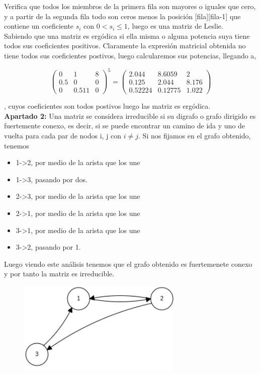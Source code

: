 \documentclass{article}
\begin{document}
Verifica que todos los miembros de la primera fila son mayores o iguales que cero, y a partir de la segunda fila todo son ceros menos la posición [fila][fila-1] que contiene un coeficiente $s_i$ con $0 < s_i \leq 1$, luego es una matriz de Leslie. \\

Sabiendo que una matriz es ergódica si ella misma o alguna potencia suya tiene todos sus coeficientes positivos. Claramente la expresión matricial obtenida no tiene todos sus coeficientes postivos, luego calcularemos sus potencias, llegando a,

\begin{equation*}
\begin{pmatrix}
0 & 1 & 8 \\
0.5 & 0 & 0 \\
0 & 0.511 & 0
\end{pmatrix}
^5 = 
\begin{pmatrix}
2.044 & 8.6059 & 2 \\
0.125 & 2.044 & 8.176 \\
0.52224 & 0.12775 & 1.022
\end{pmatrix}
\end{equation*}

, cuyos coeficientes son todos postivos luego las matriz es ergódica. \\ 

\textbf{Apartado 2:}
Una matriz se considera irreducible si su digrafo o grafo dirigido es fuertemente conexo, es decir, si se puede encontrar un camino de ida y uno de vuelta para cada par de nodos i, j con $i \neq j$. Si nos fijamos en el grafo obtenido, tenemos

\begin{itemize}
\item 1->2, por medio de la arista que los une
\item 1->3, pasando por dos.
\item 2->3, por medio de la arista que los une
\item 2->1, por medio de la arista que los une
\item 3->1, por medio de la arista que los une
\item 3->2, pasando por 1.
\end{itemize}

Luego viendo este análisis tenemos que el grafo obtenido es fuertemenete conexo y por tanto la matriz es irreducible.
\begin{figure}[t]
\centering
\includegraphics[width=0.7\textwidth,scale=1]{grafo_dirigido.png}

\end{figure}
\\ \\
\end{document}
